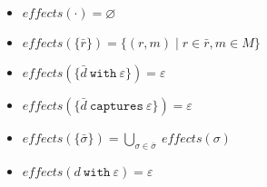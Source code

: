 \documentclass{article}
\newcommand{\keywadj}[1]{\mathtt{#1}}
\newcommand{\keyw}[1]{\keywadj{#1}~}
\begin{document}
\begin{itemize}
	\item $effects(\cdot) = \varnothing$
	\item $effects(\{\bar r\}) = \{ (r, m) \mid r \in \bar r, m \in M \}$
	\item $effects(\{ \bar d~\keyw{with} \varepsilon \}) = \varepsilon$
	\item $effects(\{ \bar d~\keyw{captures} \varepsilon \}) = \varepsilon$
	\item $effects( \{ \bar \sigma \}) = \bigcup_{\sigma \in \bar \sigma}~effects(\sigma)$
	\item $effects(d~\keyw{with} \varepsilon) = \varepsilon$
\end{itemize}
\end{document}
